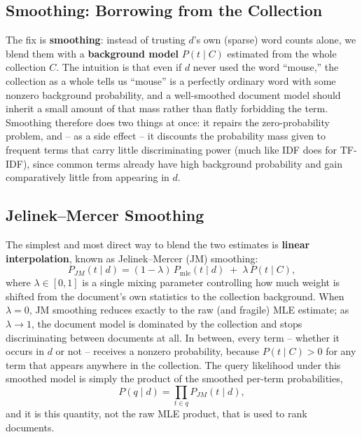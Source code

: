 \documentclass[11pt, a4paper]{article}
\begin{document}
\subsection{Smoothing: Borrowing from the Collection}

The fix is \textbf{smoothing}: instead of trusting $d$'s own (sparse) word counts alone, we blend them with a \textbf{background model} $P(t\mid C)$ estimated from the whole collection $C$. The intuition is that even if $d$ never used the word ``mouse,'' the collection as a whole tells us ``mouse'' is a perfectly ordinary word with some nonzero background probability, and a well-smoothed document model should inherit a small amount of that mass rather than flatly forbidding the term. Smoothing therefore does two things at once: it repairs the zero-probability problem, and -- as a side effect -- it discounts the probability mass given to frequent terms that carry little discriminating power (much like IDF does for TF-IDF), since common terms already have high background probability and gain comparatively little from appearing in $d$.

\subsection{Jelinek--Mercer Smoothing}

The simplest and most direct way to blend the two estimates is \textbf{linear interpolation}, known as Jelinek--Mercer (JM) smoothing:
\[
P_{JM}(t\mid d) = (1-\lambda)\,P_{\text{mle}}(t\mid d) \;+\; \lambda\, P(t\mid C),
\]
where $\lambda\in[0,1]$ is a single mixing parameter controlling how much weight is shifted from the document's own statistics to the collection background. When $\lambda=0$, JM smoothing reduces exactly to the raw (and fragile) MLE estimate; as $\lambda\to1$, the document model is dominated by the collection and stops discriminating between documents at all. In between, every term -- whether it occurs in $d$ or not -- receives a nonzero probability, because $P(t\mid C)>0$ for any term that appears anywhere in the collection. The query likelihood under this smoothed model is simply the product of the smoothed per-term probabilities,
\[
P(q\mid d) = \prod_{t\in q} P_{JM}(t\mid d),
\]
and it is this quantity, not the raw MLE product, that is used to rank documents.
\end{document}
